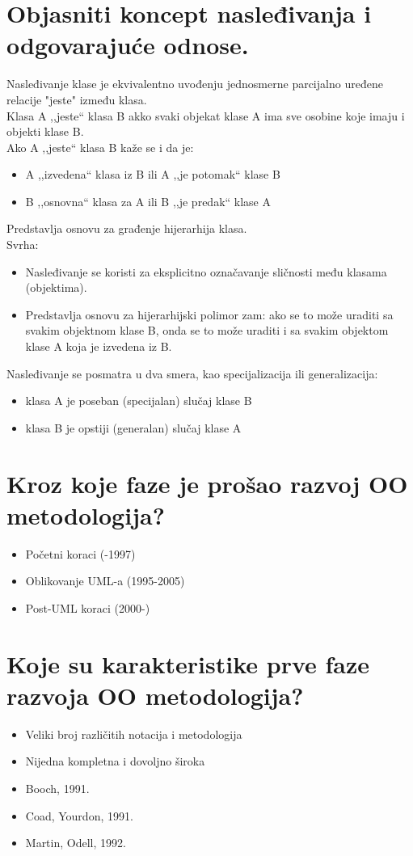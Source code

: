 \documentclass[a4paper]{article}
\begin{document}
\section{Objasniti koncept nasleđivanja  i odgovarajuće odnose.}
  Nasleđivanje klase je ekvivalentno uvođenju jednosmerne parcijalno uređene 
  relacije "jeste" između klasa.\\
  Klasa A ,,jeste`` klasa B akko svaki objekat klase A ima sve osobine koje imaju i objekti klase B.\\
  Ako A ,,jeste`` klasa B kaže se i da je:
  \begin{itemize}
    \item A ,,izvedena`` klasa iz B ili A ,,je potomak`` klase B
    \item B ,,osnovna`` klasa za A ili B ,,je predak`` klase A
  \end{itemize}
  Predstavlja osnovu za građenje hijerarhija klasa.\\
  Svrha:
  \begin{itemize}
    \item Nasleđivanje se koristi za eksplicitno označavanje sličnosti među klasama (objektima).
    \item Predstavlja osnovu za hijerarhijski polimor zam: ako se to može uraditi sa svakim objektnom klase B, 
          onda se to može uraditi i sa svakim objektom klase A koja je izvedena iz B.
  \end{itemize}
  Nasleđivanje se posmatra u dva smera, kao specijalizacija ili generalizacija:
  \begin{itemize}
    \item klasa A je poseban (specijalan) slučaj klase B
    \item klasa B je opstiji (generalan) slučaj klase A
  \end{itemize}

\section{Kroz koje faze je prošao razvoj OO metodologija?}
  \begin{itemize}
    \item Početni koraci (-1997)
    \item Oblikovanje UML-a (1995-2005)
    \item Post-UML koraci (2000-)
  \end{itemize}

\section{Koje su karakteristike prve faze razvoja OO metodologija?}
  \begin{itemize}
    \item Veliki broj različitih notacija i metodologija
    \item Nijedna kompletna i dovoljno široka
    \item Booch, 1991.
    \item Coad, Yourdon, 1991.
    \item Martin, Odell, 1992.
  \end{itemize}
\end{document}
